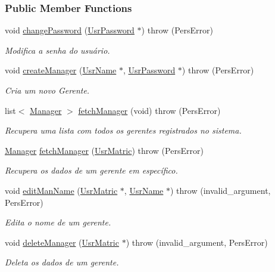 \subsubsection*{Public Member Functions}
\begin{DoxyCompactItemize}
\item 
void \hyperlink{classStubUserManAdm_a63130507e95ab092b0bf09704b13b6ec}{change\-Password} (\hyperlink{classUsrPassword}{Usr\-Password} $\ast$)  throw (\-Pers\-Error)
\begin{DoxyCompactList}\small\item\em Modifica a senha do usuário. \end{DoxyCompactList}\item 
void \hyperlink{classStubUserManAdm_ac833e3729b1adf46edf78376719acde5}{create\-Manager} (\hyperlink{classUsrName}{Usr\-Name} $\ast$, \hyperlink{classUsrPassword}{Usr\-Password} $\ast$)  throw (\-Pers\-Error)
\begin{DoxyCompactList}\small\item\em Cria um novo Gerente. \end{DoxyCompactList}\item 
list$<$ \hyperlink{classManager}{Manager} $>$ \hyperlink{classStubUserManAdm_a5aa1a8d94912f9971f17bcd8a52dfa7c}{fetch\-Manager} (void)  throw (\-Pers\-Error)
\begin{DoxyCompactList}\small\item\em Recupera uma lista com todos os gerentes registrados no sistema. \end{DoxyCompactList}\item 
\hyperlink{classManager}{Manager} \hyperlink{classStubUserManAdm_a66bdd469d275154728c929e0581aaa71}{fetch\-Manager} (\hyperlink{classUsrMatric}{Usr\-Matric})  throw (\-Pers\-Error)
\begin{DoxyCompactList}\small\item\em Recupera os dados de um gerente em específico. \end{DoxyCompactList}\item 
void \hyperlink{classStubUserManAdm_ac1da713638e441434c8ec426be495a0b}{edit\-Man\-Name} (\hyperlink{classUsrMatric}{Usr\-Matric} $\ast$, \hyperlink{classUsrName}{Usr\-Name} $\ast$)  throw (invalid\-\_\-argument, Pers\-Error)
\begin{DoxyCompactList}\small\item\em Edita o nome de um gerente. \end{DoxyCompactList}\item 
void \hyperlink{classStubUserManAdm_a45f93196f3de7a92ebd0688007b47e5f}{delete\-Manager} (\hyperlink{classUsrMatric}{Usr\-Matric} $\ast$)  throw (invalid\-\_\-argument, Pers\-Error)
\begin{DoxyCompactList}\small\item\em Deleta os dados de um gerente. \end{DoxyCompactList}\end{DoxyCompactItemize}



